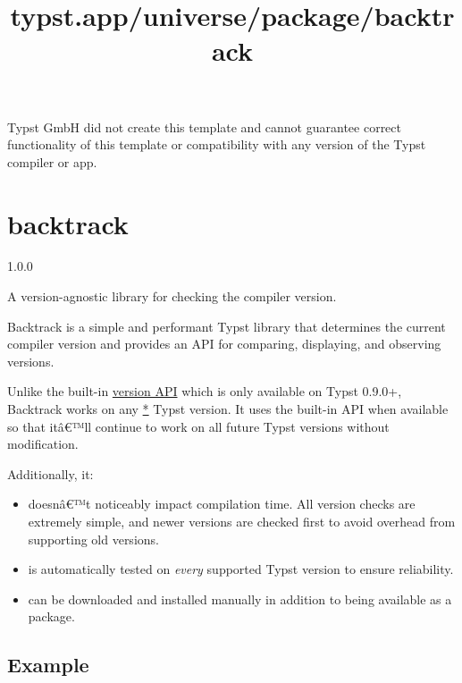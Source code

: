 Typst GmbH did not create this template and cannot guarantee correct
functionality of this template or compatibility with any version of the
Typst compiler or app.


\title{typst.app/universe/package/backtrack}

\label{banner}
\section{backtrack}\label{backtrack}

{ 1.0.0 }

A version-agnostic library for checking the compiler version.

\label{readme}
Backtrack is a simple and performant Typst library that determines the
current compiler version and provides an API for comparing, displaying,
and observing versions.

Unlike the built-in
\href{https://github.com/typst/typst/pull/2016}{version API} which is
only available on Typst 0.9.0+, Backtrack works on any
\href{https://github.com/typst/packages/raw/main/packages/preview/backtrack/1.0.0/\#version-support}{*}
Typst version. It uses the built-in API when available so that itâ€™ll
continue to work on all future Typst versions without modification.

Additionally, it:

\begin{itemize}
\tightlist
\item
  doesnâ€™t noticeably impact compilation time. All version checks are
  extremely simple, and newer versions are checked first to avoid
  overhead from supporting old versions.
\item
  is automatically tested on \emph{every} supported Typst version to
  ensure reliability.
\item
  can be downloaded and installed manually in addition to being
  available as a package.
\end{itemize}

\subsection{Example}\label{example}

\begin{Shaded}
\begin{Highlighting}[]

\NormalTok{\#\{}
\NormalTok{  if current{-}version.cmpable \textless{}= versions.v2023{-}03{-}28.cmpable [}
\NormalTok{  ] else if current{-}version.cmpable \textless{} versions.v0{-}5{-}0.cmpable [}
\NormalTok{  ] else [}
\NormalTok{  ]}
\NormalTok{\}}
\end{Highlighting}
\end{Shaded}

